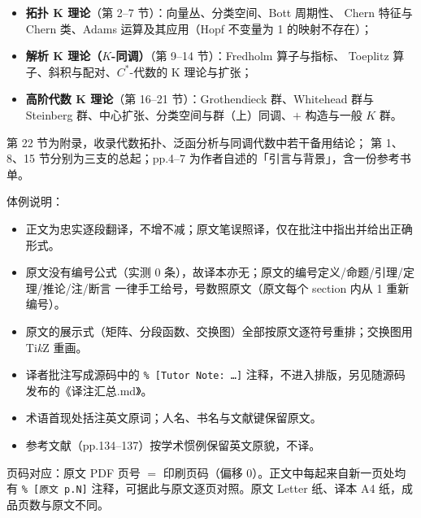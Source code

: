 \begin{itemize}[leftmargin=1.6em,itemsep=2pt]
  \item \textbf{拓扑 K 理论}（第 2--7 节）：向量丛、分类空间、Bott 周期性、
        Chern 特征与 Chern 类、Adams 运算及其应用（Hopf 不变量为 1 的映射不存在）；
  \item \textbf{解析 K 理论（$K$-同调）}（第 9--14 节）：Fredholm 算子与指标、
        Toeplitz 算子、斜积与配对、$C^*$-代数的 K 理论与扩张；
  \item \textbf{高阶代数 K 理论}（第 16--21 节）：Grothendieck 群、Whitehead 群与
        Steinberg 群、中心扩张、分类空间与群（上）同调、$+$ 构造与一般 $K$ 群。
\end{itemize}

第 22 节为附录，收录代数拓扑、泛函分析与同调代数中若干备用结论；
第 1、8、15 节分别为三支的总起；pp.4--7 为作者自述的「引言与背景」，含一份参考书单。

体例说明：
\begin{itemize}[leftmargin=1.6em,itemsep=2pt]
  \item 正文为忠实逐段翻译，不增不减；原文笔误照译，仅在批注中指出并给出正确形式。
  \item 原文没有编号公式（实测 0 条），故译本亦无；原文的编号定义/命题/引理/定理/推论/注/断言
        一律手工给号，号数照原文（原文每个 section 内从 1 重新编号）。
  \item 原文的展示式（矩阵、分段函数、交换图）全部按原文逐符号重排；交换图用 Ti\emph{k}Z 重画。
  \item 译者批注写成源码中的 \verb|% [Tutor Note: …]| 注释，不进入排版，另见随源码发布的《译注汇总.md》。
  \item 术语首现处括注英文原词；人名、书名与文献键保留原文。
  \item 参考文献（pp.134--137）按学术惯例保留英文原貌，不译。
\end{itemize}

\vspace{0.6em}
\noindent 页码对应：原文 PDF 页号 $=$ 印刷页码（偏移 0）。正文中每起来自新一页处均有
\verb|% [原文 p.N]| 注释，可据此与原文逐页对照。原文 Letter 纸、译本 A4 纸，成品页数与原文不同。

\clearpage
\tableofcontents
\clearpage
